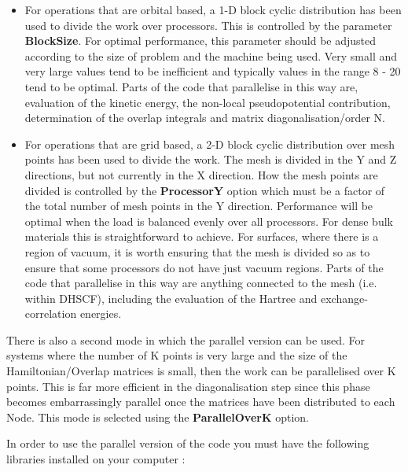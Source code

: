 \documentclass[11pt]{article}
\begin{document}
\begin{itemize}
\item
For operations that are orbital based, a 1-D block cyclic distribution
has been used to divide the work over processors. This is controlled
by the parameter {\bf BlockSize}.
For optimal performance, this parameter
should be adjusted according to the size of problem and the machine
being used. Very small and very large values tend to be inefficient
and typically values in the range 8 - 20 tend to be optimal. Parts of
the code that parallelise in this way are, evaluation of the kinetic
energy, the non-local pseudopotential contribution, determination of
the overlap integrals and matrix diagonalisation/order N.

\item
For operations that are grid based, a 2-D block cyclic distribution
over mesh points has been used to divide the work. The mesh is divided
in the Y and Z directions, but not currently in the X direction. How
the mesh points are divided is controlled by the {\bf ProcessorY}
option which must be a factor of the total number of mesh points in the Y
direction. Performance will be optimal when the load is balanced evenly
over all processors. For dense bulk materials this is straightforward
to achieve. For surfaces, where there is a region of vacuum, it is
worth ensuring that the mesh is divided so as to ensure that some
processors do not have just vacuum regions. Parts of the code that
parallelise in this way are anything connected to the mesh (i.e. within
DHSCF), including the evaluation of the Hartree and exchange-correlation
energies.
\end{itemize}

There is also a second mode in which the parallel version can be used. For
systems where the number of K points is very large and the size of the
Hamiltonian/Overlap matrices is small, then the work can be parallelised
over K points. This is far more efficient in the diagonalisation step
since this phase becomes embarrassingly parallel once the matrices have
been distributed to each Node. This mode is selected using the 
{\bf ParallelOverK} 
option.

In order to use the parallel version of the code you must have the following
libraries installed on your computer :
\end{document}
